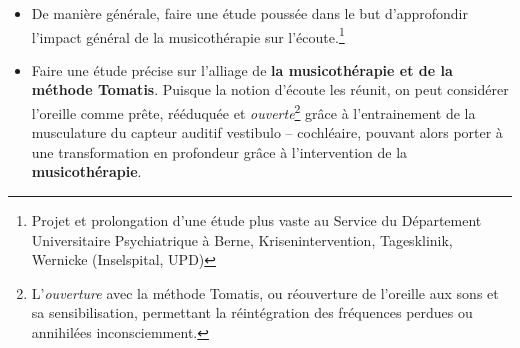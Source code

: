 \begin{itemize}
\item De manière générale, faire une étude poussée dans le but d'approfondir l'impact général de la
  musicothérapie sur l'écoute.\footnote{ Projet et
  prolongation d'une étude plus vaste au Service du
  Département Universitaire Psychiatrique à Berne, Krisenintervention,
  Tagesklinik, Wernicke (Inselspital, UPD) }
   \item
     Faire une étude précise sur l'alliage de \textbf{la
       musicothérapie et de la méthode Tomatis}. Puisque la notion d'écoute les réunit, on
     peut considérer l'oreille comme
prête, rééduquée et \textit{ouverte}\footnote{L'\emph{ouverture} avec la méthode Tomatis, ou réouverture de l'oreille
aux sons et sa sensibilisation, permettant la réintégration
des fréquences perdues ou annihilées inconsciemment. }  grâce à l'entrainement de la musculature du capteur auditif
vestibulo -- cochléaire, pouvant alors
porter à une transformation en profondeur grâce à l'intervention de la \textbf{musicothérapie}.


\end{itemize}

